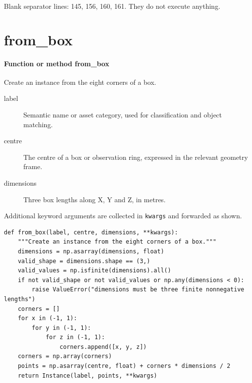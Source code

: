 \documentclass[11pt,a4paper]{book}
\begin{document}
Blank separator lines: 145, 156, 160, 161. They do not execute anything.

\section{from\_box}

\paragraph{Function or method from\_box}
Create an instance from the eight corners of a box.

\begin{description}
\item[label] Semantic name or asset category, used for classification and object matching.
\item[centre] The centre of a box or observation ring, expressed in the relevant geometry frame.
\item[dimensions] Three box lengths along X, Y and Z, in metres.
\end{description}
Additional keyword arguments are collected in \texttt{kwargs} and forwarded as shown.

\begin{lstlisting}[firstnumber=162]
def from_box(label, centre, dimensions, **kwargs):
    """Create an instance from the eight corners of a box."""
    dimensions = np.asarray(dimensions, float)
    valid_shape = dimensions.shape == (3,)
    valid_values = np.isfinite(dimensions).all()
    if not valid_shape or not valid_values or np.any(dimensions < 0):
        raise ValueError("dimensions must be three finite nonnegative lengths")
    corners = []
    for x in (-1, 1):
        for y in (-1, 1):
            for z in (-1, 1):
                corners.append([x, y, z])
    corners = np.array(corners)
    points = np.asarray(centre, float) + corners * dimensions / 2
    return Instance(label, points, **kwargs)
\end{lstlisting}
\end{document}
